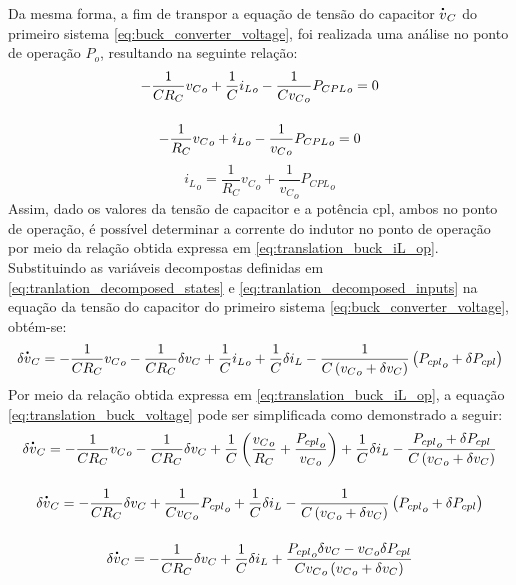 Da mesma forma, a fim de transpor a equação de tensão do capacitor $\dt{v}_C$ do primeiro sistema \eqref{eq:buck_converter_voltage}, foi realizada uma análise no ponto de operação $P_o$, resultando na seguinte relação: \begin{gather}
  - \frac{1}{C R_C} {v_C}_o + \frac{1}{C} {i_L}_o - \frac{1}{C {v_C}_o} {P_{CPL}}_o = 0 \notag \\[12pt]
  - \frac{1}{R_C} {v_C}_o + {i_L}_o - \frac{1}{{v_C}_o} {P_{CPL}}_o = 0 \notag
\end{gather} \begin{equation}{i_L}_o = \frac{1}{R_C} {v_C}_o + \frac{1}{{v_C}_o} {P_{CPL}}_o \label{eq:translation_buck_iL_op}\end{equation} Assim, dado os valores da tensão de capacitor e a potência \acrshort{cpl}, ambos no ponto de operação, é possível determinar a corrente do indutor no ponto de operação por meio da relação obtida expressa em \eqref{eq:translation_buck_iL_op}. Substituindo as variáveis decompostas definidas em \eqref{eq:tranlation_decomposed_states} e \eqref{eq:tranlation_decomposed_inputs} na equação da tensão do capacitor do primeiro sistema \eqref{eq:buck_converter_voltage}, obtém-se: \begin{equation}
  \delta \dt{v}_C = - \frac{1}{C R_C} {v_C}_o - \frac{1}{C R_C} \delta v_C + \frac{1}{C} {i_L}_o + \frac{1}{C}  \delta i_L - \frac{1}{C \left({v_C}_o + \delta v_C\right)} \left({P_{cpl}}_o + \delta P_{cpl}\right) \label{eq:translation_buck_voltage}
\end{equation} Por meio da relação obtida expressa em \eqref{eq:translation_buck_iL_op}, a equação \eqref{eq:translation_buck_voltage} pode ser simplificada como demonstrado a seguir: \begin{gather}
  \delta \dt{v}_C = - \frac{1}{C R_C} {v_C}_o - \frac{1}{C R_C} \delta v_C + \frac{1}{C} \left(\frac{{v_C}_o}{R_C} + \frac{{P_{cpl}}_o}{{v_C}_o}\right) + \frac{1}{C}  \delta i_L - \frac{{P_{cpl}}_o + \delta P_{cpl}}{C \left({v_C}_o + \delta v_C\right)} \notag \\[12pt]
  \delta \dt{v}_C = - \frac{1}{C R_C} \delta v_C + \frac{1}{C {v_C}_o} {P_{cpl}}_o + \frac{1}{C}  \delta i_L - \frac{1}{C \left({v_C}_o + \delta v_C\right)} \left({P_{cpl}}_o + \delta P_{cpl}\right) \notag \\[12pt]
  \delta \dt{v}_C = - \frac{1}{C R_C} \delta v_C  + \frac{1}{C}  \delta i_L + \frac{{P_{cpl}}_o \delta v_C - {v_C}_o \delta P_{cpl}}{C {v_C}_o \left({v_C}_o + \delta v_C\right)}
\end{gather}

